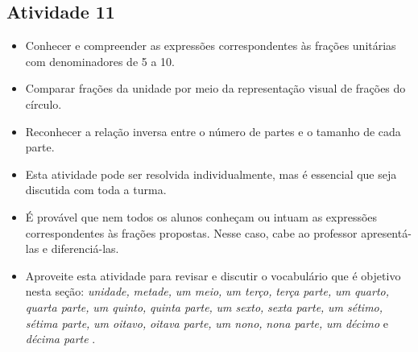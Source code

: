 \subsection{Atividade 11}
   \vspace{.1cm}

\begin{itemize} %
    \item Conhecer e compreender as expressões correspondentes às frações unitárias com denominadores de 5 a 10.
    \item Comparar frações da unidade por meio da representação visual de frações do círculo.
    \item Reconhecer a relação inversa entre o número de partes e o tamanho de cada parte.
\end{itemize} %
 \vspace{.1cm}

   \vspace{.1cm}

  \begin{itemize} %
    \item       Esta atividade pode ser resolvida individualmente, mas é essencial que seja discutida com toda a turma.
    \item       É provável que nem todos os alunos conheçam ou intuam as expressões correspondentes às frações propostas. Nesse caso, cabe ao professor apresentá-las e diferenciá-las.
    \item       Aproveite esta atividade para revisar e discutir o vocabulário que é objetivo nesta seção:       {\it unidade,}             {\it metade,}             {\it um meio,}             {\it um terço,}             {\it terça parte,}             {\it um quarto,}             {\it quarta parte,}             {\it um quinto,}             {\it quinta parte,}             {\it um sexto,}             {\it sexta parte,}             {\it um sétimo,}             {\it sétima parte,}             {\it um oitavo,}             {\it oitava parte,}             {\it um nono,}             {\it nona parte,}             {\it um décimo}       e       {\it décima parte}      .
\end{itemize} %

